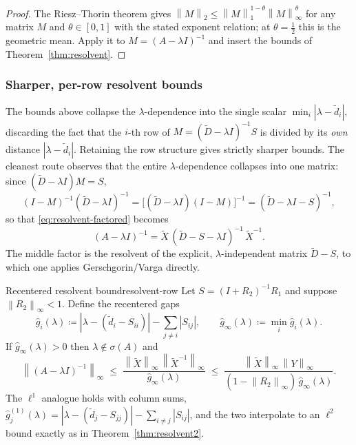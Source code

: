 \documentclass[11pt, a4paper]{article}
\numberwithin{equation}{section}
\newcommand{\norm}[1]{\left\|#1\right\|}
\newcommand{\abs}[1]{\left|#1\right|}
\newcommand{\tX}{\widetilde{X}}
\newcommand{\tD}{\widetilde{D}}
\begin{document}
\begin{proof}
The Riesz--Thorin theorem gives $\norm{M}_2 \le \norm{M}_1^{1-\theta}
\norm{M}_\infty^{\theta}$ for any matrix $M$ and $\theta \in [0,1]$ with the
stated exponent relation; at $\theta = \tfrac12$ this is the geometric mean.
Apply it to $M = (A - \lambda I)^{-1}$ and insert the bounds of
Theorem~\ref{thm:resolvent}.
\end{proof}

\subsubsection*{Sharper, per-row resolvent bounds}

The bounds above collapse the $\lambda$-dependence into the single scalar
$\min_i\abs{\lambda - \tilde d_i}$, discarding the fact that the $i$-th row of
$M = (\tD - \lambda I)^{-1}S$ is divided by its \emph{own} distance $\abs{\lambda
- \tilde d_i}$.  Retaining the row structure gives strictly sharper bounds.  The
cleanest route observes that the entire $\lambda$-dependence collapses into one
matrix: since $(\tD - \lambda I)M = S$,
\[
  (I - M)^{-1}(\tD - \lambda I)^{-1}
    = \bigl[(\tD - \lambda I)(I - M)\bigr]^{-1}
    = (\tD - \lambda I - S)^{-1},
\]
so that \eqref{eq:resolvent-factored} becomes
\begin{equation}\label{eq:resolvent-clean}
  (A - \lambda I)^{-1} = \tX\,(\tD - S - \lambda I)^{-1}\,\tX^{-1}.
\end{equation}
The middle factor is the resolvent of the explicit, $\lambda$-independent matrix
$\tD - S$, to which one applies Gerschgorin/Varga directly.

\begin{theorem}{Recentered resolvent bound}{resolvent-row}
  Let $S = (I+R_2)^{-1}R_1$ and suppose $\norm{R_2}_\infty < 1$.  Define the
  recentered gaps
  \[
    \hat g_i(\lambda) \coloneqq \abs{\lambda - (\tilde d_i - S_{ii})}
      - \sum_{j \ne i}\abs{S_{ij}},
    \qquad
    \hat g_\infty(\lambda) \coloneqq \min_i \hat g_i(\lambda).
  \]
  If $\hat g_\infty(\lambda) > 0$ then $\lambda \notin \sigma(A)$ and
  \[
    \norm{(A - \lambda I)^{-1}}_\infty
      \;\le\; \frac{\norm{\tX}_\infty\,\norm{\tX^{-1}}_\infty}{\hat g_\infty(\lambda)}
      \;\le\; \frac{\norm{\tX}_\infty\,\norm{Y}_\infty}
                   {(1 - \norm{R_2}_\infty)\,\hat g_\infty(\lambda)}.
  \]
  The $\ell^1$ analogue holds with column sums, $\hat g^{(1)}_j(\lambda) =
  \abs{\lambda - (\tilde d_j - S_{jj})} - \sum_{i \ne j}\abs{S_{ij}}$, and the
  two interpolate to an $\ell^2$ bound exactly as in
  Theorem~\textup{\ref{thm:resolvent2}}.
\end{theorem}
\end{document}
